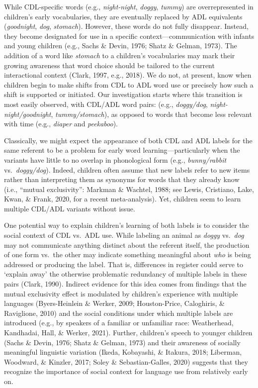 \documentclass[10pt, letterpaper]{article}
\begin{document}
While CDL-specific words (e.g., \emph{night-night}, \emph{doggy},
\emph{tummy}) are overrepresented in children's early vocabularies, they
are eventually replaced by ADL equivalents (\emph{goodnight},
\emph{dog}, \emph{stomach}). However, these words do not fully
disappear. Instead, they become designated for use in a specific
context---communication with infants and young children (e.g., Sachs \&
Devin, 1976; Shatz \& Gelman, 1973). The addition of a word like
\emph{stomach} to a children's vocabularies may mark their growing
awareness that word choice should be tailored to the current
interactional context (Clark, 1997, e.g., 2018). We do not, at present,
know when children begin to make shifts from CDL to ADL word use or
precisely how such a shift is supported or initiated. Our investigation
starts where this transition is most easily observed, with CDL/ADL word
pairs: (e.g., \emph{doggy/dog}, \emph{night-night/goodnight},
\emph{tummy/stomach}), as opposed to words that become less relevant
with time (e.g., \emph{diaper} and \emph{peekaboo}).

Classically, we might expect the appearance of both CDL and ADL labels
for the same referent to be a problem for early word
learning---particularly when the variants have little to no overlap in
phonological form (e.g., \emph{bunny/rabbit} vs.~\emph{doggy/dog}).
Indeed, children often assume that new labels refer to new items rather
than interpreting them as synonyms for words that they already know
(i.e., {``mutual exclusivity''}: Markman \& Wachtel, 1988; see Lewis,
Cristiano, Lake, Kwan, \& Frank, 2020, for a recent meta-analysis). Yet,
children seem to learn multiple CDL/ADL variants without issue.

One potential way to explain children's learning of both labels is to
consider the social context of CDL vs.~ADL use. While labeling an animal
as \emph{doggy} vs.~\emph{dog} may not communicate anything distinct
about the referent itself, the production of one form vs.~the other may
indicate something meaningful about \emph{who} is being addressed or
producing the label. That is, differences in register could serve to
`explain away' the otherwise problematic redundancy of multiple labels
in these pairs (Clark, 1990). Indirect evidence for this idea comes from
findings that the mutual exclusivity effect is modulated by children's
experience with multiple languages (Byers-Heinlein \& Werker, 2009;
Houston-Price, Caloghiris, \& Raviglione, 2010) and the social
conditions under which multiple labels are introduced (e.g., by speakers
of a familiar or unfamiliar race: Weatherhead, Kandhadai, Hall, \&
Werker, 2021). Further, children's speech to younger children (Sachs \&
Devin, 1976; Shatz \& Gelman, 1973) and their awareness of socially
meaningful linguistic variation (Ikeda, Kobayashi, \& Itakura, 2018;
Liberman, Woodward, \& Kinzler, 2017; Soley \& Sebastian-Galles, 2020)
suggests that they recognize the importance of social context for
language use from relatively early on.
\end{document}
